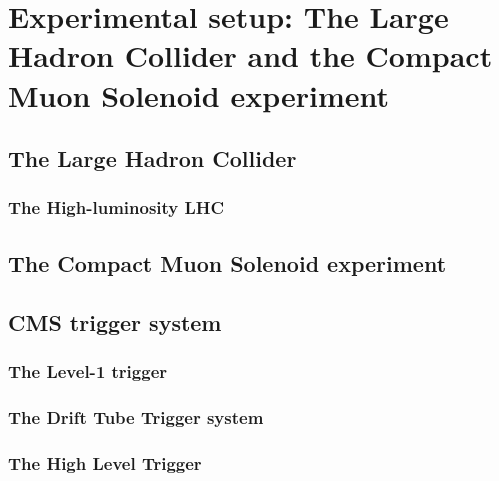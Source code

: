 \documentclass[../main.tex]{subfiles}
\begin{document}
\chapter{Experimental setup: The Large Hadron Collider and the Compact Muon Solenoid experiment}

\section{The Large Hadron Collider}

\subsection{The High-luminosity LHC}

\section{The Compact Muon Solenoid experiment}

\section{CMS trigger system}

\subsection{The Level-1 trigger}

\subsection{The Drift Tube Trigger system}

\subsection{The High Level Trigger}
\end{document}
